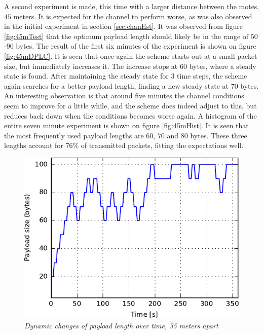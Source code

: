 A second experiment is made, this time with a larger distance between the motes, $45$ meters. It is expected for the channel to perform worse, as was also observed in the initial experiment in section \ref{sec:chanEst}. It was observed from figure \ref{fig:45mTest} that the optimum payload length should likely be in the range of $50$-$90$ bytes. The result of the first six minutes of the experiment is shown on figure \ref{fig:45mDPLC}. It is seen that once again the scheme starts out at a small packet size, but immediately increases it. The increase stops at $60$ bytes, where a steady state is found. After maintaining the steady state for $3$ time steps, the scheme again searches for a better payload length, finding a new steady state at $70$ bytes. An interesting observation is that around five minutes the channel conditions seem to improve for a little while, and the scheme does indeed adjust to this, but reduces back down when the conditions becomes worse again. A histogram of the entire seven minute experiment is shown on figure \ref{fig:45mHist}. It is seen that the most frequently used payload lengths are $60$, $70$ and $80$ bytes. These three lengths account for $76\%$ of transmitted packets, fitting the expectations well. 
\begin{figure}
\centering
\includegraphics[scale=1]{figs/35mDPLC.pdf} 
\caption{\textit{Dynamic changes of payload length over time, 35 meters apart}\label{fig:35mDPLC}}
\end{figure}

